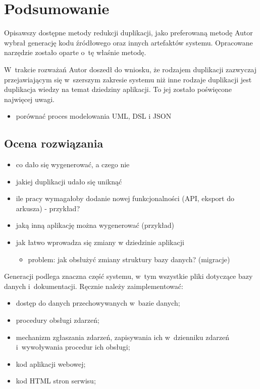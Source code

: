 \chapter{Podsumowanie} \label{chap:outro}

Opisawszy dostępne metody redukcji duplikacji, jako preferowaną metodę Autor wybrał generację kodu źródłowego oraz innych artefaktów systemu.
Opracowane narzędzie zostało oparte o~tę właśnie metodę.

W~trakcie rozważań Autor doszedł do wniosku, że rodzajem duplikacji zazwyczaj przejawiającym się w~szerszym zakresie systemu niż inne rodzaje duplikacji jest duplikacja wiedzy na temat dziedziny aplikacji.
To jej zostało poświęcone najwięcej uwagi.



\begin{itemize}
 \item porównać proces modelowania UML, DSL i JSON
\end{itemize}



\section{Ocena rozwiązania}

\begin{itemize}
 \item co dało się wygenerować, a czego nie
 \item jakiej duplikacji udało się uniknąć
 \item ile pracy wymagałoby dodanie nowej funkcjonalności (API, eksport do arkusza) - przykład?
 \item jaką inną aplikację można wygenerować (przykład)
 \item jak łatwo wprowadza się zmiany w dziedzinie aplikacji
  \begin{itemize}
   \item problem: jak obsłużyć zmiany struktury bazy danych? (migracje)
  \end{itemize}
\end{itemize}

Generacji podlega znaczna część systemu, w~tym wszystkie pliki dotyczące bazy danych i~dokumentacji.
Ręcznie należy zaimplementować:

\begin{itemize}
 \item dostęp do danych przechowywanych w~bazie danych;
 \item procedury obsługi zdarzeń;
 \item mechanizm zgłaszania zdarzeń, zapisywania ich w~dzienniku zdarzeń i~wywoływania procedur ich obsługi;
 \item kod aplikacji webowej;
 \item kod HTML stron serwisu;
\end{itemize}



